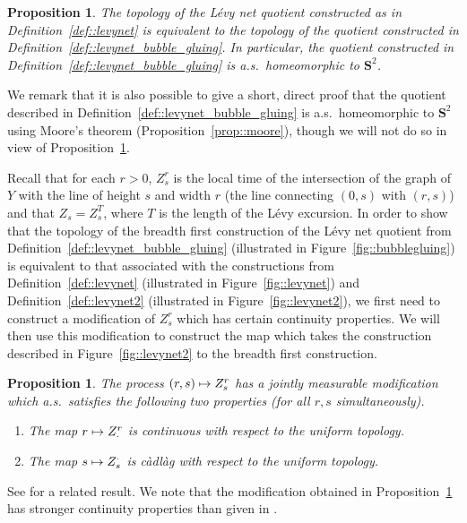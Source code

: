 \documentclass[10pt]{amsart}
\newcommand\mto{\mathchoice{\longmapsto}{\mapsto}{\mapsto}{\mapsto}}
\theoremstyle{plain}
\numberwithin{theorem}{section}
\newtheorem{proposition}[theorem]{Proposition}
\theoremstyle{definition}
\renewcommand{\S}{{\mathbf S}}
\newcommand{\cadlag}{càdlàg}
\begin{document}
\begin{proposition}
\label{prop::levy_net_equivalent_topology}
The topology of the Lévy net quotient constructed as in Definition~\ref{def::levynet} is equivalent to the topology of the quotient constructed in Definition~\ref{def::levynet_bubble_gluing}. In particular, the quotient constructed in Definition~\ref{def::levynet_bubble_gluing} is a.s.\ homeomorphic to $\S^2$.
\end{proposition}

We remark that it is also possible to give a short, direct proof that the quotient described in Definition~\ref{def::levynet_bubble_gluing} is a.s.\ homeomorphic to $\S^2$ using Moore's theorem (Proposition~\ref{prop::moore}), though we will not do so in view of Proposition~\ref{prop::levy_net_equivalent_topology}.

Recall that for each $r > 0$, $Z_s^r$ is the local time of the intersection of the graph of~$Y$ with the line of height $s$ and width $r$ (\ie the line connecting $(0,s)$ with $(r,s)$) and that $Z_s = Z_s^T$, where $T$ is the length of the Lévy excursion. In order to show that the topology of the breadth first construction of the Lévy net quotient from Definition~\ref{def::levynet_bubble_gluing} (illustrated in Figure~\ref{fig::bubblegluing}) is equivalent to that associated with the constructions from Definition~\ref{def::levynet} (illustrated in Figure~\ref{fig::levynet}) and Definition~\ref{def::levynet2} (illustrated in Figure~\ref{fig::levynet2}), we first need to construct a modification of $Z_s^r$ which has certain continuity properties. We will then use this modification to construct the map which takes the construction described in Figure~\ref{fig::levynet2} to the breadth first construction.

\begin{proposition}
\label{prop::local_time_cadlag_modification}
The process $(r,s) \mto Z_s^r$ has a jointly measurable modification which a.s.\ satisfies the following two properties (for all $r,s$ simultaneously).
\begin{enumerate}
\item The map $r \mto Z_\cdot^r$ is continuous with respect to the uniform topology.
\item The map $s \mto Z_s^\cdot$ is {\cadlag} with respect to the uniform topology.
\end{enumerate}
\end{proposition}

See \cite[Prop.\,1.3.3]{dlg2002trees_levy} for a related result. We note that the modification obtained in Proposition~\ref{prop::local_time_cadlag_modification} has stronger continuity properties than given in \cite[Prop.\,1.3.3]{dlg2002trees_levy}.
\end{document}
